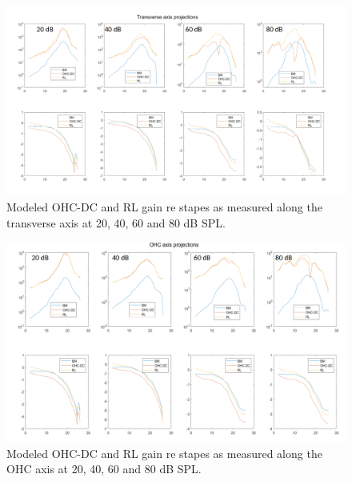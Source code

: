 \documentclass{article}
\begin{document}
\begin{figure}
	\centering
	\includegraphics[width=\textwidth]{Figures/grosspiezot.png}
	\caption{Modeled OHC-DC and RL gain re stapes as measured along the transverse axis at 20, 40, 60 and 80 dB SPL.}
	\label{grosspiezot}
\end{figure}

\begin{figure}
	\centering
	\includegraphics[width=\textwidth]{Figures/grosspiezoo.png}
	\caption{Modeled OHC-DC and RL gain re stapes as measured along the OHC axis at 20, 40, 60 and 80 dB SPL.}
	\label{grosspiezoo}
\end{figure}
\end{document}
